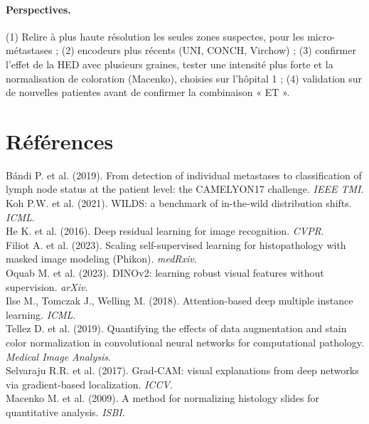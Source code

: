 \documentclass[11pt,a4paper]{article}
\begin{document}
\paragraph{Perspectives.} (1) Relire à plus haute résolution les seules zones suspectes, pour les micro-métastases ;
(2) encodeurs plus récents (UNI, CONCH, Virchow) ; (3) confirmer l'effet de la HED avec plusieurs graines, tester une intensité plus forte et la normalisation de
coloration (Macenko), choisies sur l'hôpital 1 ; (4) validation sur de nouvelles patientes avant de confirmer la combinaison « ET ».

\section*{Références}
\small
\noindent Bándi P. et al. (2019). From detection of individual metastases to classification of lymph node status at the patient level:
the CAMELYON17 challenge. \emph{IEEE TMI}.\\
Koh P.W. et al. (2021). WILDS: a benchmark of in-the-wild distribution shifts. \emph{ICML}.\\
He K. et al. (2016). Deep residual learning for image recognition. \emph{CVPR}.\\
Filiot A. et al. (2023). Scaling self-supervised learning for histopathology with masked image modeling (Phikon). \emph{medRxiv}.\\
Oquab M. et al. (2023). DINOv2: learning robust visual features without supervision. \emph{arXiv}.\\
Ilse M., Tomczak J., Welling M. (2018). Attention-based deep multiple instance learning. \emph{ICML}.\\
Tellez D. et al. (2019). Quantifying the effects of data augmentation and stain color normalization in convolutional neural networks
for computational pathology. \emph{Medical Image Analysis}.\\
Selvaraju R.R. et al. (2017). Grad-CAM: visual explanations from deep networks via gradient-based localization. \emph{ICCV}.\\
Macenko M. et al. (2009). A method for normalizing histology slides for quantitative analysis. \emph{ISBI}.
\end{document}
